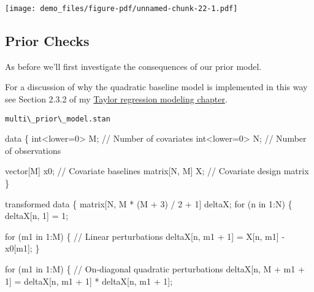 \documentclass[
  letterpaper,
  DIV=11,
  numbers=noendperiod]{scrartcl}
\newenvironment{Shaded}{\begin{snugshade}}{\end{snugshade}}
\newcommand{\CommentTok}[1]{\textcolor[rgb]{0.37,0.37,0.37}{#1}}
\newcommand{\ControlFlowTok}[1]{\textcolor[rgb]{0.00,0.23,0.31}{#1}}
\newcommand{\DataTypeTok}[1]{\textcolor[rgb]{0.68,0.00,0.00}{#1}}
\newcommand{\DecValTok}[1]{\textcolor[rgb]{0.68,0.00,0.00}{#1}}
\newcommand{\KeywordTok}[1]{\textcolor[rgb]{0.00,0.23,0.31}{#1}}
\newcommand{\NormalTok}[1]{\textcolor[rgb]{0.00,0.23,0.31}{#1}}
\begin{document}
\texttt{[image: demo\_files/figure-pdf/unnamed-chunk-22-1.pdf]}

\subsection{Prior Checks}\label{prior-checks-1}

As before we'll first investigate the consequences of our prior model.

For a discussion of why the quadratic baseline model is implemented in
this way see Section 2.3.2 of my
\href{https://betanalpha.github.io/assets/case_studies/taylor_models.html\#232_Higher-Order_Implementations}{Taylor
regression modeling chapter}.

\begin{codelisting}

\caption{\texttt{multi\textbackslash\_prior\textbackslash\_model.stan}}

\begin{Shaded}
\begin{Highlighting}[]
\KeywordTok{data}\NormalTok{ \{}
  \DataTypeTok{int}\NormalTok{\textless{}}\KeywordTok{lower}\NormalTok{=}\DecValTok{0}\NormalTok{\textgreater{} M;  }\CommentTok{// Number of covariates}
  \DataTypeTok{int}\NormalTok{\textless{}}\KeywordTok{lower}\NormalTok{=}\DecValTok{0}\NormalTok{\textgreater{} N;  }\CommentTok{// Number of observations}
  
  \DataTypeTok{vector}\NormalTok{[M] x0;    }\CommentTok{// Covariate baselines}
  \DataTypeTok{matrix}\NormalTok{[N, M] X;  }\CommentTok{// Covariate design matrix}
\NormalTok{\}}

\KeywordTok{transformed data}\NormalTok{ \{}
  \DataTypeTok{matrix}\NormalTok{[N, M * (M + }\DecValTok{3}\NormalTok{) / }\DecValTok{2}\NormalTok{ + }\DecValTok{1}\NormalTok{] deltaX;}
  \ControlFlowTok{for}\NormalTok{ (n }\ControlFlowTok{in} \DecValTok{1}\NormalTok{:N) \{}
\NormalTok{    deltaX[n, }\DecValTok{1}\NormalTok{] = }\DecValTok{1}\NormalTok{;}
    
    \ControlFlowTok{for}\NormalTok{ (m1 }\ControlFlowTok{in} \DecValTok{1}\NormalTok{:M) \{}
      \CommentTok{// Linear perturbations}
\NormalTok{      deltaX[n, m1 + }\DecValTok{1}\NormalTok{] = X[n, m1] {-} x0[m1];}
\NormalTok{    \}}
    
    \ControlFlowTok{for}\NormalTok{ (m1 }\ControlFlowTok{in} \DecValTok{1}\NormalTok{:M) \{}
      \CommentTok{// On{-}diagonal quadratic perturbations}
\NormalTok{      deltaX[n, M + m1 + }\DecValTok{1}\NormalTok{] }
\NormalTok{        = deltaX[n, m1 + }\DecValTok{1}\NormalTok{] * deltaX[n, m1 + }\DecValTok{1}\NormalTok{];}
  

\end{Highlighting}
\end{Shaded}
\end{codelisting}
\end{document}
